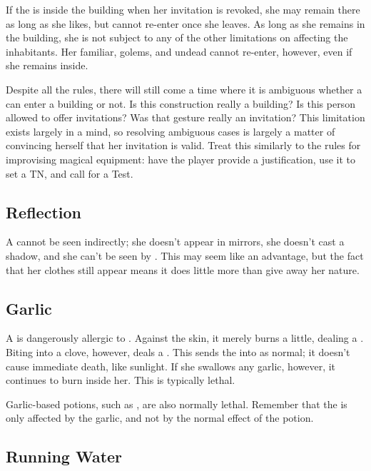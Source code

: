 If the {\vampire} is inside the building when her invitation is revoked, she may remain there as long as she likes, but cannot re-enter once she leaves.
As long as she remains in the building, she is not subject to any of the other limitations on affecting the inhabitants.
Her familiar, golems, and undead cannot re-enter, however, even if she remains inside.

Despite all the rules, there will still come a time where it is ambiguous whether a {\vampire} can enter a building or not.
Is this construction really a building?
Is this person allowed to offer invitations?
Was that gesture really an invitation?
This limitation exists largely in a {\vampirepossessive} mind, so resolving ambiguous cases is largely a matter of convincing herself that her invitation is valid.
Treat this similarly to the rules for improvising magical equipment: have the player provide a justification, use it to set a TN, and call for a  Test.

\subsection{Reflection}

A {\vampire} cannot be seen indirectly; she doesn't appear in mirrors, she doesn't cast a shadow, and she can't be seen by .
This may seem like an advantage, but the fact that her clothes still appear means it does little more than give away her {\vampiric} nature.

\subsection{Garlic}

A {\vampire} is dangerously allergic to .
Against the skin, it merely burns a little, dealing a  {\damagetest}.
Biting into a clove, however, deals a  {\damagetest}.
This {\damagetest} sends the {\vampire} into {\shock} as normal; it doesn't cause immediate death, like sunlight.
If she swallows any garlic, however, it continues to burn inside her.
This is typically lethal.

Garlic-based potions, such as , are also normally lethal.
Remember that the {\vampire} is only affected by the garlic, and not by the normal effect of the potion.

\subsection{Running Water}


